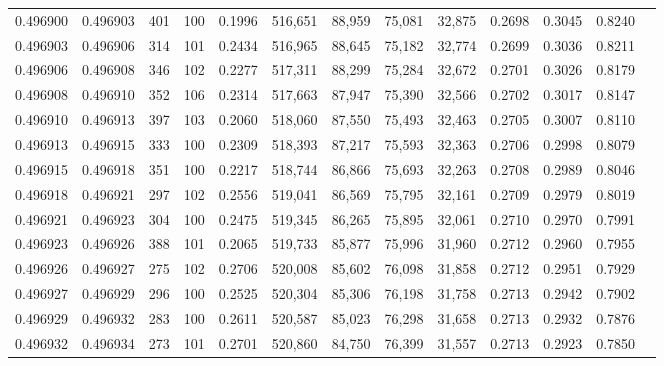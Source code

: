 \begin{tabular}{rrrrrrrrrrrrr}
0.496900 & 0.496903 &   401 & 100 &                                     0.1996 & 516,651 &  88,959 &  75,081 &  32,875 & 0.2698 & 0.3045 & 0.8240 \\
0.496903 & 0.496906 &   314 & 101 &                                     0.2434 & 516,965 &  88,645 &  75,182 &  32,774 & 0.2699 & 0.3036 & 0.8211 \\
0.496906 & 0.496908 &   346 & 102 &                                     0.2277 & 517,311 &  88,299 &  75,284 &  32,672 & 0.2701 & 0.3026 & 0.8179 \\
0.496908 & 0.496910 &   352 & 106 &                                     0.2314 & 517,663 &  87,947 &  75,390 &  32,566 & 0.2702 & 0.3017 & 0.8147 \\
0.496910 & 0.496913 &   397 & 103 &                                     0.2060 & 518,060 &  87,550 &  75,493 &  32,463 & 0.2705 & 0.3007 & 0.8110 \\
0.496913 & 0.496915 &   333 & 100 &                                     0.2309 & 518,393 &  87,217 &  75,593 &  32,363 & 0.2706 & 0.2998 & 0.8079 \\
0.496915 & 0.496918 &   351 & 100 &                                     0.2217 & 518,744 &  86,866 &  75,693 &  32,263 & 0.2708 & 0.2989 & 0.8046 \\
0.496918 & 0.496921 &   297 & 102 &                                     0.2556 & 519,041 &  86,569 &  75,795 &  32,161 & 0.2709 & 0.2979 & 0.8019 \\
0.496921 & 0.496923 &   304 & 100 &                                     0.2475 & 519,345 &  86,265 &  75,895 &  32,061 & 0.2710 & 0.2970 & 0.7991 \\
0.496923 & 0.496926 &   388 & 101 &                                     0.2065 & 519,733 &  85,877 &  75,996 &  31,960 & 0.2712 & 0.2960 & 0.7955 \\
0.496926 & 0.496927 &   275 & 102 &                                     0.2706 & 520,008 &  85,602 &  76,098 &  31,858 & 0.2712 & 0.2951 & 0.7929 \\
0.496927 & 0.496929 &   296 & 100 &                                     0.2525 & 520,304 &  85,306 &  76,198 &  31,758 & 0.2713 & 0.2942 & 0.7902 \\
0.496929 & 0.496932 &   283 & 100 &                                     0.2611 & 520,587 &  85,023 &  76,298 &  31,658 & 0.2713 & 0.2932 & 0.7876 \\
0.496932 & 0.496934 &   273 & 101 &                                     0.2701 & 520,860 &  84,750 &  76,399 &  31,557 & 0.2713 & 0.2923 & 0.7850 \\

\end{tabular}
